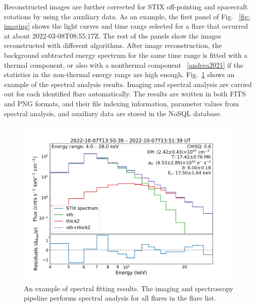 \documentclass[referee]{aa} %
\begin{document}
Reconstructed images are further corrected for STIX off-pointing and spacecraft rotations by using the auxiliary data. As an example,  the first panel of Fig. ~\ref{fig: imaging} shows the light curves and time range selected for a flare that occurred at about 2022-03-08T08:55:17Z.
The rest of the panels show the images reconstructed with different algorithms. 
After image reconstruction, the background subtracted energy spectrum for the same time range  is fitted with a thermal component, or also with a nonthermal component ~\ref{andrea2021} if the statistics in the non-thermal energy range are high enough.  Fig.~\ref{fig:ospex} shows an example of the spectral analysis results.
Imaging and spectral analysis are carried out for each identified flare automatically.  
The results are written in both FITS and PNG formats, and their 
file indexing information, parameter values from spectral analysis, and auxiliary data are stored in the NoSQL database.

\begin{figure}[h]
  \centering
  \includegraphics[width=0.9\linewidth]{figures/ospex.pdf}
  \caption{An example of spectral fitting results. 
    The imaging and spectroscopy pipeline performs
    spectral analysis for all flares in the flare list. }
  \label{fig:ospex}
\end{figure}
\end{document}
